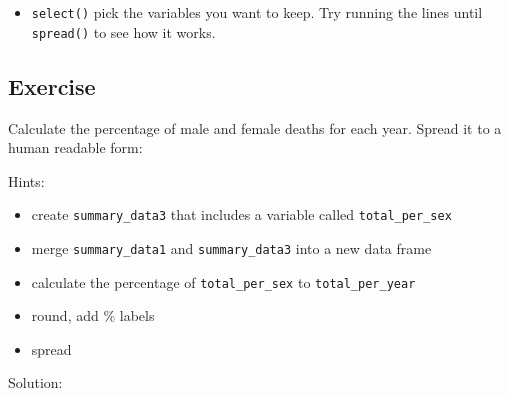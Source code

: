 \documentclass[12pt,]{krantz}
\makeatletter
\newenvironment{Shaded}{\begin{snugshade}}{\end{snugshade}}
\newcommand{\DataTypeTok}[1]{\textcolor[rgb]{0.13,0.29,0.53}{#1}}
\newcommand{\KeywordTok}[1]{\textcolor[rgb]{0.13,0.29,0.53}{\textbf{#1}}}
\newcommand{\NormalTok}[1]{#1}
\newcommand{\OperatorTok}[1]{\textcolor[rgb]{0.81,0.36,0.00}{\textbf{#1}}}
\newcommand{\StringTok}[1]{\textcolor[rgb]{0.31,0.60,0.02}{#1}}
\providecommand{\tightlist}{%
  \setlength{\itemsep}{0pt}\setlength{\parskip}{0pt}}
\newenvironment{kframe}{%
\medskip{}
\setlength{\fboxsep}{.8em}
 \def\at@end@of@kframe{}%
 \ifinner\ifhmode%
  \def\at@end@of@kframe{\end{minipage}}%
  \begin{minipage}{\columnwidth}%
 \fi\fi%
 \def\FrameCommand##1{\hskip\@totalleftmargin \hskip-\fboxsep
 \colorbox{shadecolor}{##1}\hskip-\fboxsep
     \hskip-\linewidth \hskip-\@totalleftmargin \hskip\columnwidth}%
 \MakeFramed {\advance\hsize-\width
   \@totalleftmargin\z@ \linewidth\hsize
   \@setminipage}}%
 {\par\unskip\endMakeFramed%
 \at@end@of@kframe}
\renewenvironment{Shaded}{\begin{kframe}}{\end{kframe}}
\theoremstyle{definition}
\theoremstyle{definition}
\theoremstyle{definition}
\theoremstyle{remark}
\makeatother
\begin{document}
\begin{itemize}
\tightlist
\item
  \texttt{select()} pick the variables you want to keep. Try running the
  lines until \texttt{spread()} to see how it works.
\end{itemize}

\hypertarget{exercise-14}{%
\subsection{Exercise}\label{exercise-14}}

Calculate the percentage of male and female deaths for each year. Spread
it to a human readable form:

Hints:

\begin{itemize}
\tightlist
\item
  create \texttt{summary\_data3} that includes a variable called
  \texttt{total\_per\_sex}
\item
  merge \texttt{summary\_data1} and \texttt{summary\_data3} into a new
  data frame
\item
  calculate the percentage of \texttt{total\_per\_sex} to
  \texttt{total\_per\_year}
\item
  round, add \% labels
\item
  spread
\end{itemize}

Solution:

\begin{Shaded}
\end{Shaded}
\end{document}
